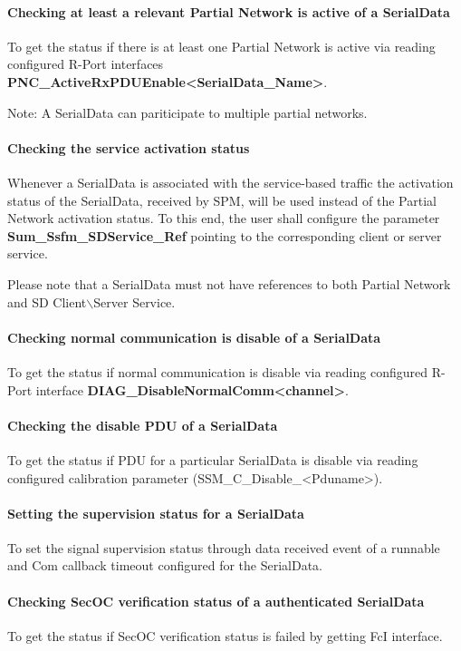 \paragraph{Checking at least a relevant Partial Network is active of a SerialData}
To get the status if there is at least one Partial Network is active via reading configured R-Port interfaces \textbf{PNC\_ActiveRxPDUEnable<SerialData\_Name>}. 

Note: A SerialData can pariticipate to multiple partial networks.

\paragraph{Checking the service activation status}
Whenever a SerialData is associated with the service-based traffic the activation status of the SerialData, received by SPM, will be used instead of the Partial Network activation status.
To this end, the user shall configure the parameter \textbf{Sum\_Ssfm\_SDService\_Ref} pointing to the corresponding client or server service.

Please note that a SerialData must not have references to both Partial Network and SD Client$\backslash$Server Service.

\paragraph{Checking normal communication is disable of a SerialData}
To get the status if normal communication is disable via reading configured R-Port interface \newline
\textbf{DIAG\_DisableNormalComm<channel>}.

\paragraph{Checking the disable PDU of a SerialData} 
To get the status if PDU for a particular SerialData is disable via reading configured calibration parameter (SSM\_C\_Disable\_<Pduname>).

\paragraph{Setting the supervision status for a SerialData} 
To set the signal supervision status through data received event of a runnable and Com callback timeout configured for the SerialData.

\paragraph{Checking SecOC verification status of a authenticated SerialData} 
To get the status if SecOC verification status is failed by getting FcI interface.

